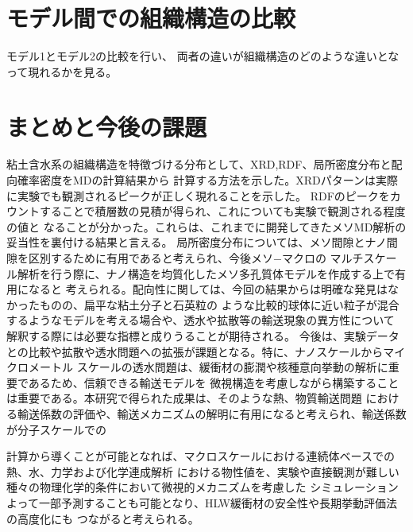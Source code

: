 ﻿\documentclass[11pt,a4j]{jarticle}
\begin{document}
\section{モデル間での組織構造の比較}
モデル1とモデル2の比較を行い、
両者の違いが組織構造のどのような違いとなって現れるかを見る。
\section{まとめと今後の課題}
粘土含水系の組織構造を特徴づける分布として、XRD,RDF、局所密度分布と配向確率密度をMDの計算結果から
計算する方法を示した。XRDパターンは実際に実験でも観測されるピークが正しく現れることを示した。
RDFのピークをカウントすることで積層数の見積が得られ、これについても実験で観測される程度の値と
なることが分かった。これらは、これまでに開発してきたメソMD解析の妥当性を裏付ける結果と言える。
局所密度分布については、メソ間隙とナノ間隙を区別するために有用であると考えられ、今後メソ−マクロの
マルチスケール解析を行う際に、ナノ構造を均質化したメソ多孔質体モデルを作成する上で有用になると
考えられる。配向性に関しては、今回の結果からは明確な発見はなかったものの、扁平な粘土分子と石英粒の
ような比較的球体に近い粒子が混合するようなモデルを考える場合や、透水や拡散等の輸送現象の異方性について
解釈する際には必要な指標と成りうることが期待される。
今後は、実験データとの比較や拡散や透水問題への拡張が課題となる。特に、ナノスケールからマイクロメートル
スケールの透水問題は、緩衝材の膨潤や核種意向挙動の解析に重要であるため、信頼できる輸送モデルを
微視構造を考慮しながら構築することは重要である。本研究で得られた成果は、そのような熱、物質輸送問題
における輸送係数の評価や、輸送メカニズムの解明に有用になると考えられ、輸送係数が分子スケールでの

計算から導くことが可能となれば、マクロスケールにおける連続体ベースでの熱、水、力学および化学連成解析
における物性値を、実験や直接観測が難しい種々の物理化学的条件において微視的メカニズムを考慮した
シミュレーションよって一部予測することも可能となり、HLW緩衝材の安全性や長期挙動評価法の高度化にも
つながると考えられる。
\end{document}
